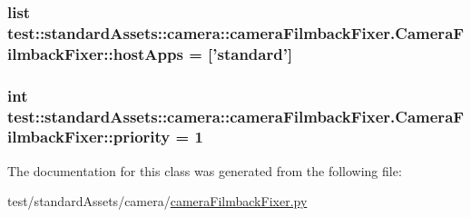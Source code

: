 \hypertarget{classtest_1_1standardAssets_1_1camera_1_1cameraFilmbackFixer_1_1CameraFilmbackFixer_a43589a8af2480387622bc672edafbcd1}{
\subsubsection[{host\-Apps}]{\setlength{\rightskip}{0pt plus 5cm}list {\bf test\-::standard\-Assets\-::camera\-::camera\-Filmback\-Fixer.\-Camera\-Filmback\-Fixer\-::host\-Apps} = \mbox{[}'standard'\mbox{]}}}\label{d5/d5f/classtest_1_1standardAssets_1_1camera_1_1cameraFilmbackFixer_1_1CameraFilmbackFixer_a43589a8af2480387622bc672edafbcd1}
\hypertarget{classtest_1_1standardAssets_1_1camera_1_1cameraFilmbackFixer_1_1CameraFilmbackFixer_a8f7aac670049d86422cd85e8cff8fd2e}{
\subsubsection[{priority}]{\setlength{\rightskip}{0pt plus 5cm}int {\bf test\-::standard\-Assets\-::camera\-::camera\-Filmback\-Fixer.\-Camera\-Filmback\-Fixer\-::priority} = 1}}\label{d5/d5f/classtest_1_1standardAssets_1_1camera_1_1cameraFilmbackFixer_1_1CameraFilmbackFixer_a8f7aac670049d86422cd85e8cff8fd2e}


\-The documentation for this class was generated from the following file\-:\begin{DoxyCompactItemize}
\item 
test/standard\-Assets/camera/\hyperlink{standardAssets_2camera_2cameraFilmbackFixer_8py}{camera\-Filmback\-Fixer.\-py}\end{DoxyCompactItemize}

